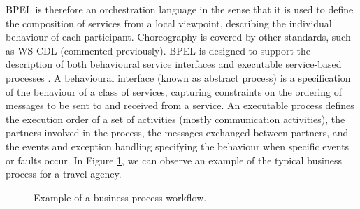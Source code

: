 BPEL is therefore an orchestration
language in the sense that it is used to define the composition
of services from a local viewpoint, describing the individual
behaviour of each participant. Choreography is covered by other standards,
such as WS-CDL (commented previously). BPEL is designed to support the description of both behavioural service interfaces and executable
service-based processes \cite{OuyangVABDH07}. A behavioural interface (known as abstract process) is a specification of the
behaviour of a class of services, capturing constraints on the ordering of messages to be sent to and
received from a service. An executable process defines the execution
order of a set of activities (mostly communication activities), the partners involved in the process, the
messages exchanged between partners, and the events and exception handling specifying the behaviour
when specific events or faults occur. In Figure \ref{bpelexample}, we can observe an example of the typical business process
for a travel agency.

\begin{figure}[h]
\begin{center}
\end{center}
\caption{Example of a business process workflow.}
\label{bpelexample}
\end{figure}

